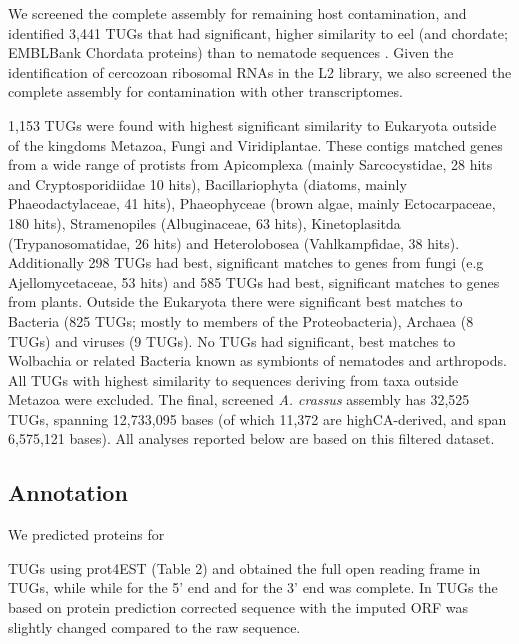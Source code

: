 \documentclass[10pt]{bmc_article}
\newenvironment{bmcformat}{\begin{raggedright}\baselineskip20pt\sloppy\setboolean{publ}{false}}{\end{raggedright}\baselineskip20pt\sloppy}
\begin{document}
\begin{bmcformat}
We screened the complete assembly for remaining host contamination,
and identified 3,441 TUGs that had significant, higher
similarity to eel (and chordate; EMBLBank Chordata proteins) than to
nematode sequences \cite{pmid21550347}. Given the identification of
cercozoan ribosomal RNAs in the L2 library, we also screened the
complete assembly for contamination with other transcriptomes. 

1,153 TUGs were found with highest significant similarity to Eukaryota
outside of the kingdoms Metazoa, Fungi and Viridiplantae. These
contigs matched genes from a wide range of protists from Apicomplexa
(mainly Sarcocystidae, 28 hits and Cryptosporidiidae 10 hits),
Bacillariophyta (diatoms, mainly Phaeodactylaceae, 41 hits),
Phaeophyceae (brown algae, mainly Ectocarpaceae, 180 hits),
Stramenopiles (Albuginaceae, 63 hits), Kinetoplasitda
(Trypanosomatidae, 26 hits) and Heterolobosea (Vahlkampfidae, 38
hits). Additionally 298 TUGs had best,
significant matches to genes from fungi (e.g Ajellomycetaceae, 53
hits) and 585 TUGs had best, significant matches to genes from
plants. Outside the Eukaryota there were significant best matches to
Bacteria (825 TUGs; mostly to members of the Proteobacteria), Archaea
(8 TUGs) and viruses (9 TUGs). No TUGs had significant, best matches
to Wolbachia or related Bacteria known as symbionts of nematodes and
arthropods. All TUGs with highest similarity to sequences deriving
from taxa outside Metazoa were excluded. The final, screened
\textit{A. crassus} assembly has
32,525 TUGs, spanning
12,733,095
bases (of which 11,372 are
highCA-derived, and span
6,575,121
bases). All analyses reported below are based on this filtered
dataset.
















\subsection*{Annotation}


We predicted proteins for

TUGs using prot4EST  (Table 2) and
obtained the full open reading frame in
 TUGs,
while while for
the 5’ end
and for  the
3' end was complete. In  TUGs the
based on protein prediction corrected sequence with the imputed ORF
was slightly changed compared to the raw sequence.





\end{bmcformat}
\end{document}
